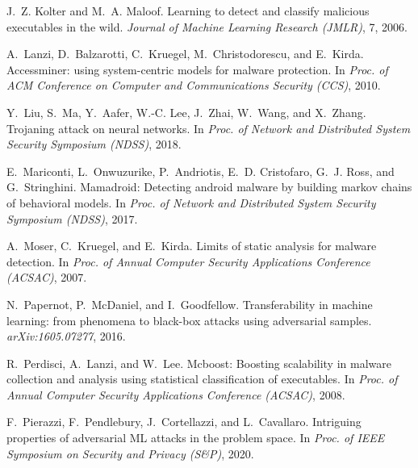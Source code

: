 \documentclass[conference]{IEEEtran}
\begin{document}
{\begin{thebibliography}{47}
	J.~Z. Kolter and M.~A. Maloof.
	\newblock Learning to detect and classify malicious executables in 
	the wild.
	\newblock \emph{Journal of Machine Learning Research ({JMLR})}, 7, 
	2006.
	
	A.~Lanzi, D.~Balzarotti, C.~Kruegel, M.~Christodorescu, and 
	E.~Kirda.
	\newblock Accessminer: using system-centric models for malware 
	protection.
	\newblock In \emph{Proc. of {ACM} Conference on Computer and 
	Communications
		Security ({CCS})}, 2010.
	
	Y.~Liu, S.~Ma, Y.~Aafer, W.-C. Lee, J.~Zhai, W.~Wang, and X.~Zhang.
	\newblock Trojaning attack on neural networks.
	\newblock In \emph{Proc. of Network and Distributed System Security 
	Symposium
		({NDSS})}, 2018.
	
	E.~Mariconti, L.~Onwuzurike, P.~Andriotis, E.~D. Cristofaro, G.~J. 
	Ross, and
	G.~Stringhini.
	\newblock Mamadroid: Detecting android malware by building markov 
	chains of
	behavioral models.
	\newblock In \emph{Proc. of Network and Distributed System Security 
	Symposium
		({NDSS})}, 2017.
	
	A.~Moser, C.~Kruegel, and E.~Kirda.
	\newblock Limits of static analysis for malware detection.
	\newblock In \emph{Proc. of Annual Computer Security Applications 
	Conference
		({ACSAC})}, 2007.
	
	N.~Papernot, P.~McDaniel, and I.~Goodfellow.
	\newblock Transferability in machine learning: from phenomena to 
	black-box
	attacks using adversarial samples.
	\newblock \emph{arXiv:1605.07277}, 2016.
	
	R.~Perdisci, A.~Lanzi, and W.~Lee.
	\newblock Mcboost: Boosting scalability in malware collection and 
	analysis
	using statistical classification of executables.
	\newblock In \emph{Proc. of Annual Computer Security Applications 
	Conference
		({ACSAC})}, 2008.
	
	F.~Pierazzi, F.~Pendlebury, J.~Cortellazzi, and L.~Cavallaro.
	\newblock Intriguing properties of adversarial {ML} attacks in the 
	problem
	space.
	\newblock In \emph{Proc. of {IEEE} Symposium on Security and 
	Privacy ({S\&P})},
	2020.
	

\end{thebibliography}}
\end{document}

